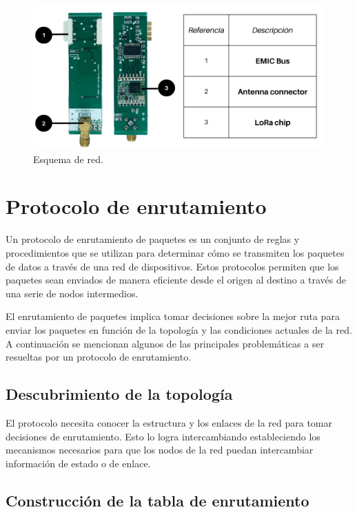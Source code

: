 \begin{figure}
\includegraphics[width=1\textwidth]{./Figures/EMIC-radio-lora.png}
\caption{Esquema de red.}
\label{fig:Hardware}
\end{figure}

\section{Protocolo de enrutamiento}

Un protocolo de enrutamiento de paquetes es un conjunto de reglas y procedimientos que se utilizan para determinar cómo se transmiten los paquetes de datos a través de una red de dispositivos. Estos protocolos permiten que los paquetes sean enviados de manera eficiente desde el origen al destino a través de una serie de nodos intermedios.

El enrutamiento de paquetes implica tomar decisiones sobre la mejor ruta para enviar los paquetes en función de la topología y las condiciones actuales de la red. A continuación se mencionan algunos de las principales problemáticas a ser resueltas por un protocolo de enrutamiento.

\subsection{Descubrimiento de la topología}

El protocolo necesita conocer la estructura y los enlaces de la red para tomar decisiones de enrutamiento. Esto lo logra intercambiando estableciendo los mecanismos necesarios para que los nodos de la red puedan intercambiar información de estado o de enlace.

\subsection{Construcción de la tabla de enrutamiento}

